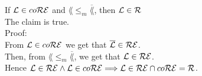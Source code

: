 If $\lang \in co\REcl$ and $\lang \leq_m \overline{\lang}$, then $\lang \in \Rcl$ \\

The claim is true. \\

Proof: \\
From $\lang \in co\REcl$ we get that $\overline{\lang} \in \REcl$.  \\
Then, from $\lang \leq_m \overline{\lang}$, we get that $\lang \in \REcl$. \\
Hence $\lang \in \REcl \wedge \lang \in co\REcl \Longrightarrow \lang \in \REcl \cap co\REcl = \Rcl$. \\
